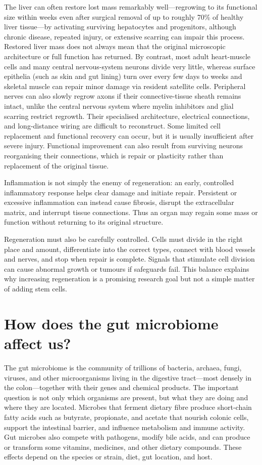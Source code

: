 \documentclass[11pt,oneside]{report}
\begin{document}
The liver can often restore lost mass remarkably well—regrowing to its
functional size within weeks even after surgical removal of up to roughly 70\%
of healthy liver tissue—by activating surviving hepatocytes and progenitors,
although chronic disease, repeated injury, or extensive scarring can impair this
process. Restored liver mass does not always mean that the original microscopic
architecture or full function has returned. By contrast, most adult
heart-muscle cells and many central nervous-system neurons divide very little,
whereas surface epithelia (such as skin and gut lining) turn over every few
days to weeks and skeletal muscle can repair minor damage via resident
satellite cells. Peripheral nerves can also slowly regrow axons if their
connective-tissue sheath remains intact, unlike the central nervous system
where myelin inhibitors and glial scarring restrict regrowth. Their specialised architecture, electrical connections, and
long-distance wiring are difficult to reconstruct. Some limited cell
replacement and functional recovery can occur, but it is usually insufficient
after severe injury. Functional improvement can also result from surviving
neurons reorganising their connections, which is repair or plasticity rather
than replacement of the original tissue.

Inflammation is not simply the enemy of regeneration: an early, controlled
inflammatory response helps clear damage and initiate repair. Persistent or
excessive inflammation can instead cause fibrosis, disrupt the extracellular
matrix, and interrupt tissue connections. Thus an organ may regain some mass or
function without returning to its original structure.

Regeneration must also be carefully controlled. Cells must divide in the right
place and amount, differentiate into the correct types, connect with blood
vessels and nerves, and stop when repair is complete. Signals that stimulate
cell division can cause abnormal growth or tumours if safeguards fail. This
balance explains why increasing regeneration is a promising research goal but
not a simple matter of adding stem cells.

\section{How does the gut microbiome affect us?}

The gut microbiome is the community of trillions of bacteria, archaea, fungi,
viruses, and other microorganisms living in the digestive tract—most densely in
the colon—together with their genes and chemical products. The important
question is not only which organisms are present, but what they are doing and
where they are located. Microbes that ferment dietary fibre produce short-chain
fatty acids such as butyrate, propionate, and acetate that nourish colonic
cells, support the intestinal barrier, and influence metabolism and immune
activity. Gut microbes also compete with pathogens, modify bile acids, and can
produce or transform some vitamins, medicines, and other dietary compounds.
These effects depend on the species or strain, diet, gut location, and host.
\end{document}
